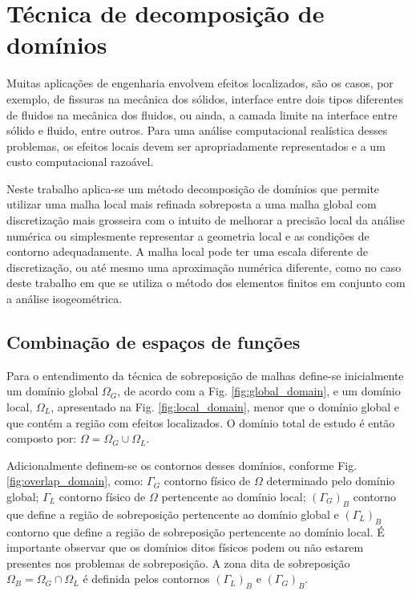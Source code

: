 \documentclass[tese_patricia]{subfiles}
\begin{document}
\chapter[Técnica de decomposição de domínios]{Técnica de decomposição de domínios} \label{capitulo:Cap5}

Muitas aplicações de engenharia envolvem efeitos localizados, são os casos, por exemplo, de fissuras na mecânica dos sólidos, interface entre dois tipos diferentes de fluidos na mecânica dos fluidos, ou ainda, a camada limite na interface entre sólido e fluido, entre outros. Para uma análise computacional realística desses problemas, os efeitos locais devem ser apropriadamente representados e a um custo computacional razoável. 

Neste trabalho aplica-se um método decomposição de domínios que permite utilizar uma malha local mais refinada sobreposta a uma malha global com discretização mais grosseira com o intuito de melhorar a precisão local da análise numérica ou simplesmente representar a geometria local e as condições de contorno adequadamente. A malha local pode ter uma escala diferente de discretização, ou até mesmo uma aproximação numérica diferente, como no caso deste trabalho em que se utiliza o método dos elementos finitos em conjunto com a análise isogeométrica.

\section{Combinação de espaços de funções}

Para o entendimento da técnica de sobreposição de malhas define-se inicialmente um dom\'inio global $\Omega_G$, de acordo com a Fig. \ref{fig:global_domain}, e um dom\'inio local, $\Omega_L$, apresentado na Fig. \ref{fig:local_domain}, menor que o dom\'inio global e que cont\'em a regi\~ao com efeitos localizados. O dom\'inio total de estudo \'e ent\~ao composto por: $\Omega = \Omega_G \cup \Omega_L$.

Adicionalmente definem-se os contornos desses dom\'inios, conforme Fig. \ref{fig:overlap_domain}, como: $\Gamma_{G}$ contorno f\'isico de $\Omega$ determinado pelo dom\'inio global; $\Gamma_{L}$ contorno f\'isico de $\Omega$ pertencente ao dom\'inio local; $(\Gamma_{G})_{B}$ contorno que define a regi\~ao de sobreposi\c{c}\~ao pertencente ao dom\'inio global e $(\Gamma_{L})_{B}$ contorno que define a regi\~ao de sobreposi\c{c}\~ao pertencente ao dom\'inio local. \'E importante observar que os dom\'inios ditos f\'isicos podem ou n\~ao estarem presentes nos problemas de sobreposi\c{c}\~ao. A zona dita de sobreposi\c{c}\~ao $\Omega_{B} = \Omega_G \cap \Omega_L$ \'e definida pelos contornos $(\Gamma_{L})_{B}$ e $(\Gamma_{G})_{B}$.
\end{document}
